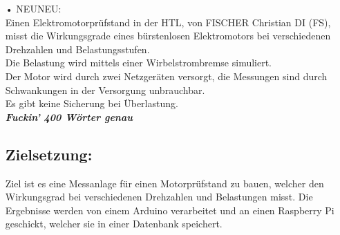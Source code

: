 \documentclass[12pt]{article}
\begin{document}
\begin{itemize}
\item[•]NEUNEU:\\
Einen Elektromotorprüfstand in der HTL, von FISCHER Christian DI (FS), misst  die Wirkungsgrade eines bürstenlosen Elektromotors bei verschiedenen Drehzahlen und Belastungsstufen. \\
Die Belastung wird mittels einer Wirbelstrombremse simuliert. \\Der Motor wird durch zwei Netzgeräten versorgt, die Messungen sind durch Schwankungen in der Versorgung unbrauchbar. \\
Es gibt keine Sicherung bei Überlastung. \\
\textit{\textbf{Fuckin' 400 Wörter genau}}





\newpage
\subsection*{Zielsetzung:}

Ziel ist es eine Messanlage für einen Motorprüfstand zu bauen, welcher den Wirkungsgrad 
bei verschiedenen Drehzahlen und Belastungen misst. Die Ergebnisse werden von einem Arduino 
verarbeitet und an einen Raspberry Pi geschickt, welcher sie in einer Datenbank speichert.\\\\\\


\end{itemize}
\end{document}
